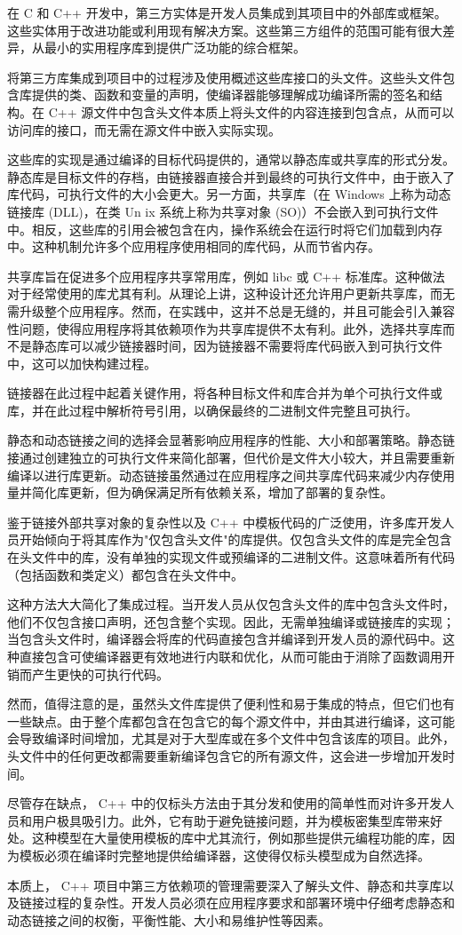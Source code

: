 在 C 和 C++ 开发中，第三方实体是开发人员集成到其项目中的外部库或框架。这些实体用于改进功能或利用现有解决方案。这些第三方组件的范围可能有很大差异，从最小的实用程序库到提供广泛功能的综合框架。

将第三方库集成到项目中的过程涉及使用概述这些库接口的头文件。这些头文件包含库提供的类、函数和变量的声明，使编译器能够理解成功编译所需的签名和结构。在 C++ 源文件中包含头文件本质上将头文件的内容连接到包含点，从而可以访问库的接口，而无需在源文件中嵌入实际实现。

这些库的实现是通过编译的目标代码提供的，通常以静态库或共享库的形式分发。静态库是目标文件的存档，由链接器直接合并到最终的可执行文件中，由于嵌入了库代码，可执行文件的大小会更大。另一方面，共享库（在 Windows 上称为动态链接库 (DLL)，在类 Un ix 系统上称为共享对象 (SO)）不会嵌入到可执行文件中。相反，这些库的引用会被包含在内，操作系统会在运行时将它们加载到内存中。这种机制允许多个应用程序使用相同的库代码，从而节省内存。

共享库旨在促进多个应用程序共享常用库，例如 libc 或 C++ 标准库。这种做法对于经常使用的库尤其有利。从理论上讲，这种设计还允许用户更新共享库，而无需升级整个应用程序。然而，在实践中，这并不总是无缝的，并且可能会引入兼容性问题，使得应用程序将其依赖项作为共享库提供不太有利。此外，选择共享库而不是静态库可以减少链接器时间，因为链接器不需要将库代码嵌入到可执行文件中，这可以加快构建过程。

链接器在此过程中起着关键作用，将各种目标文件和库合并为单个可执行文件或库，并在此过程中解析符号引用，以确保最终的二进制文件完整且可执行。

静态和动态链接之间的选择会显著影响应用程序的性能、大小和部署策略。静态链接通过创建独立的可执行文件来简化部署，但代价是文件大小较大，并且需要重新编译以进行库更新。动态链接虽然通过在应用程序之间共享库代码来减少内存使用量并简化库更新，但为确保满足所有依赖关系，增加了部署的复杂性。

鉴于链接外部共享对象的复杂性以及 C++ 中模板代码的广泛使用，许多库开发人员开始倾向于将其库作为"仅包含头文件"的库提供。仅包含头文件的库是完全包含在头文件中的库，没有单独的实现文件或预编译的二进制文件。这意味着所有代码（包括函数和类定义）都包含在头文件中。

这种方法大大简化了集成过程。当开发人员从仅包含头文件的库中包含头文件时，他们不仅包含接口声明，还包含整个实现。因此，无需单独编译或链接库的实现；当包含头文件时，编译器会将库的代码直接包含并编译到开发人员的源代码中。这种直接包含可使编译器更有效地进行内联和优化，从而可能由于消除了函数调用开销而产生更快的可执行代码。

然而，值得注意的是，虽然头文件库提供了便利性和易于集成的特点，但它们也有一些缺点。由于整个库都包含在包含它的每个源文件中，并由其进行编译，这可能会导致编译时间增加，尤其是对于大型库或在多个文件中包含该库的项目。此外，头文件中的任何更改都需要重新编译包含它的所有源文件，这会进一步增加开发时间。

尽管存在缺点， C++ 中的仅标头方法由于其分发和使用的简单性而对许多开发人员和用户极具吸引力。此外，它有助于避免链接问题，并为模板密集型库带来好处。这种模型在大量使用模板的库中尤其流行，例如那些提供元编程功能的库，因为模板必须在编译时完整地提供给编译器，这使得仅标头模型成为自然选择。

本质上， C++ 项目中第三方依赖项的管理需要深入了解头文件、静态和共享库以及链接过程的复杂性。开发人员必须在应用程序要求和部署环境中仔细考虑静态和动态链接之间的权衡，平衡性能、大小和易维护性等因素。


